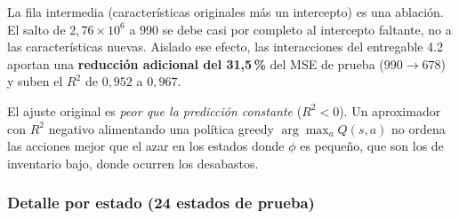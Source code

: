 \documentclass[11pt,letterpaper]{article}
\begin{document}
La fila intermedia (características originales más un intercepto) es una ablación.
El salto de $2{,}76\times10^{6}$ a $990$ se debe casi por completo al intercepto
faltante, no a las características nuevas. Aislado ese efecto, las interacciones del
entregable 4.2 aportan una \textbf{reducción adicional del 31{,}5\,\%} del MSE de
prueba ($990 \to 678$) y suben el $R^2$ de $0{,}952$ a $0{,}967$.

El ajuste original es \emph{peor que la predicción constante} ($R^2 < 0$). Un
aproximador con $R^2$ negativo alimentando una política greedy
$\arg\max_a Q(s,a)$ no ordena las acciones mejor que el azar en los estados donde
$\phi$ es pequeño, que son los de inventario bajo, donde ocurren los desabastos.

\subsubsection*{Detalle por estado (24 estados de prueba)}
\end{document}
